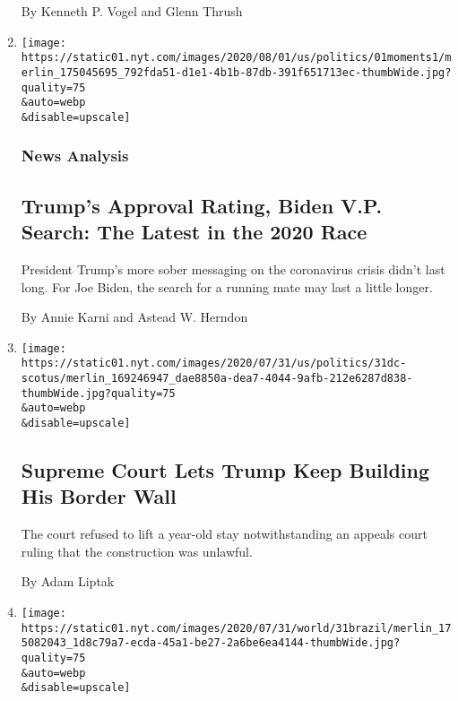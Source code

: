 \begin{enumerate}
  By Kenneth P. Vogel and Glenn Thrush
\item
  \href{/2020/08/01/us/politics/trump-biden-polls-vp.html}{}

  \texttt{[image: https://static01.nyt.com/images/2020/08/01/us/politics/01moments1/merlin\_175045695\_792fda51-d1e1-4b1b-87db-391f651713ec-thumbWide.jpg?quality=75\\\&auto=webp\\\&disable=upscale]}

  \hypertarget{news-analysis}{%
  \subsubsection{News Analysis}\label{news-analysis}}

  \hypertarget{trumps-approval-rating-biden-vp-search-the-latest-in-the-2020-race}{%
  \subsection{Trump's Approval Rating, Biden V.P. Search: The Latest in
  the 2020
  Race}\label{trumps-approval-rating-biden-vp-search-the-latest-in-the-2020-race}}

  President Trump's more sober messaging on the coronavirus crisis
  didn't last long. For Joe Biden, the search for a running mate may
  last a little longer.

  By Annie Karni and Astead W. Herndon
\item
  \href{/2020/07/31/us/supreme-court-trump-border-wall.html}{}

  \texttt{[image: https://static01.nyt.com/images/2020/07/31/us/politics/31dc-scotus/merlin\_169246947\_dae8850a-dea7-4044-9afb-212e6287d838-thumbWide.jpg?quality=75\\\&auto=webp\\\&disable=upscale]}

  \hypertarget{supreme-court-lets-trump-keep-building-his-border-wall}{%
  \subsection{Supreme Court Lets Trump Keep Building His Border
  Wall}\label{supreme-court-lets-trump-keep-building-his-border-wall}}

  The court refused to lift a year-old stay notwithstanding an appeals
  court ruling that the construction was unlawful.

  By Adam Liptak
\item
  \href{/2020/07/31/world/americas/brazil-trump-ethanol-chapman.html}{}

  \texttt{[image: https://static01.nyt.com/images/2020/07/31/world/31brazil/merlin\_175082043\_1d8c79a7-ecda-45a1-be27-2a6be6ea4144-thumbWide.jpg?quality=75\\\&auto=webp\\\&disable=upscale]}


\end{enumerate}

